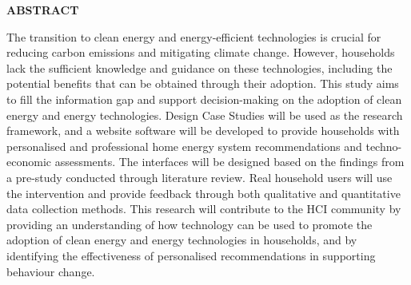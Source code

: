  \setcounter{page}{2}
\begin{center}
{\Large{\bf{ABSTRACT}}}
\end{center}

\noindent

The transition to clean energy and energy-efficient technologies is crucial for reducing carbon emissions and mitigating climate change. 
However, households lack the sufficient knowledge and guidance on these technologies, including the potential benefits that can be obtained through their adoption.
This study aims to fill the information gap and support decision-making on the adoption of clean energy and energy technologies. 
Design Case Studies will be used as the research framework, and a website software will be developed to provide households with personalised and professional home energy system recommendations and techno-economic assessments. 
The interfaces will be designed based on the findings from a pre-study conducted through literature review. 
Real household users will use the intervention and provide feedback through both qualitative and quantitative data collection methods. 
This research will contribute to the HCI community by providing an understanding of how technology can be used to promote the adoption of clean energy and energy technologies in households, 
and by identifying the effectiveness of personalised recommendations in supporting behaviour change. 
\clearpage